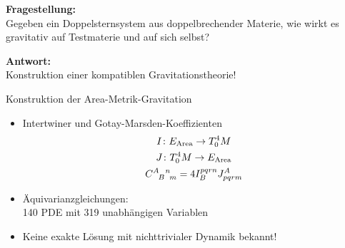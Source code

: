 \documentclass{beamer}
\newcommand{\gmc}[4]{\ensuremath{C^{#1\hphantom{#2}#3}_{\hphantom{#1}{#2}\hphantom{#3}#4}}}
\begin{document}
    \begin{frame}
        \textbf{Fragestellung:} \\
        Gegeben ein Doppelsternsystem aus doppelbrechender Materie, wie wirkt es
        gravitativ auf Testmaterie und auf sich selbst? \pause

        \alert{
            \textbf{Antwort:} \\
            Konstruktion einer kompatiblen Gravitationstheorie!
        }
    \end{frame}

    \begin{frame}{Konstruktion der Area-Metrik-Gravitation}
        \begin{itemize}
            \item Intertwiner und Gotay-Marsden-Koeffizienten
            \begin{gather*}
                I \colon E_\text{Area} \rightarrow T^4_0 M \\
                J  \colon T^4_0 M \rightarrow E_\text{Area} \\
                \gmc{A}{B}{n}{m} = 4 I^{pqrn}_B J_{pqrm}^A
            \end{gather*}
            \item Äquivarianzgleichungen: \\
            140 PDE mit 319 unabhängigen Variablen
            \item Keine exakte Lösung mit nichttrivialer Dynamik bekannt!
        \end{itemize}
    \end{frame}
\end{document}
